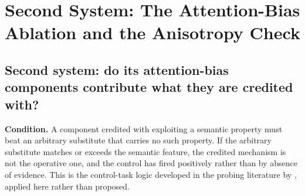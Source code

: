 %

\section{Second System: The Attention-Bias Ablation and the Anisotropy Check}
\label{sup:s1}

\subsection{Second system: do its attention-bias components contribute what they are credited with?}
\label{sup:sec:m-control-rq3}

\textbf{Condition.} A component credited with exploiting a semantic property must beat an arbitrary
substitute that carries no such property. If the arbitrary substitute matches or exceeds the
semantic feature, the credited mechanism is not the operative one, and the control has fired
positively rather than by absence of evidence. This is the control-task logic developed in the
probing literature by \citet{hewitt2019control}, applied here rather than proposed.

